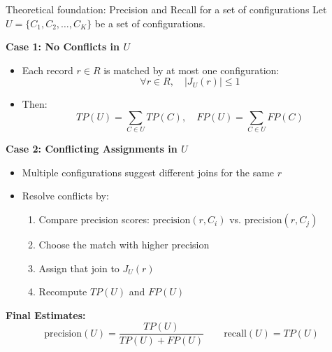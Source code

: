 \documentclass[8pt]{beamer} %
\begin{document}
\begin{frame}{Theoretical foundation: Precision and Recall for a set of configurations}
	Let $U = \{C_1, C_2, \dots, C_K\}$ be a set of configurations.
	
	\vspace{0.5em}
	\textbf{Case 1: No Conflicts in $U$}
	\begin{itemize}
		\item Each record $r \in R$ is matched by at most one configuration:
		$$
		\forall r \in R, \quad |J_U(r)| \leq 1
		$$
		\item Then:
		$$
		TP(U) = \sum_{C \in U} TP(C), \quad
		FP(U) = \sum_{C \in U} FP(C)
		$$
	\end{itemize}
	
	\vspace{0.5em}
	\textbf{Case 2: Conflicting Assignments in $U$}
	\begin{itemize}
		\item Multiple configurations suggest different joins for the same $r$
		\item Resolve conflicts by:
		\begin{enumerate}
			\item Compare precision scores: $\text{precision}(r, C_i)$ vs. $\text{precision}(r, C_j)$
			\item Choose the match with higher precision
			\item Assign that join to $J_U(r)$
			\item Recompute $TP(U)$ and $FP(U)$
		\end{enumerate}
	\end{itemize}
	
	\vspace{0.5em}
	\textbf{Final Estimates:}
	$$
	\text{precision}(U) = \frac{TP(U)}{TP(U) + FP(U)} \qquad
	\text{recall}(U) = TP(U)
	$$
\end{frame}
\end{document}
